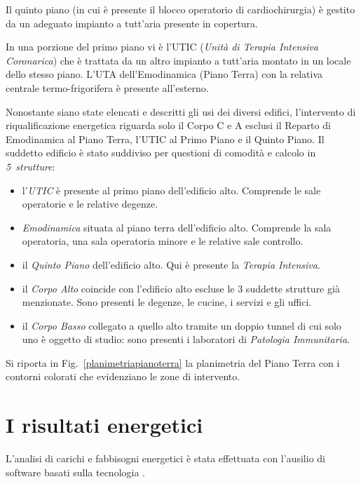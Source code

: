 Il quinto piano (in cui è presente il blocco operatorio di cardiochirurgia) è gestito da un adeguato impianto a tutt'aria presente in copertura.

In una porzione del primo piano vi è l'UTIC (\emph{Unità di Terapia Intensiva Coronarica}) che è trattata da un altro impianto a tutt'aria montato in un locale dello stesso piano. L'UTA dell'Emodinamica (Piano Terra) con la relativa centrale termo-frigorifera è presente all'esterno.

Nonostante siano state elencati e descritti gli usi dei diversi edifici, l'intervento di riqualificazione energetica riguarda solo il Corpo C e A esclusi il Reparto di Emodinamica al Piano Terra, l'UTIC al Primo Piano e il Quinto Piano.
Il suddetto edificio è stato suddiviso per questioni di comodità e calcolo in \emph{5~strutture}:
\begin{itemize}
	\item l'\emph{UTIC} è presente al primo piano dell'edificio alto. Comprende le sale operatorie e le relative degenze.
	\item \emph{Emodinamica} situata al piano terra dell'edificio alto. Comprende la sala operatoria, una sala operatoria minore e le relative sale controllo.
	\item il \emph{Quinto Piano} dell'edificio alto. Qui è presente la \emph{Terapia Intensiva}.
	\item il \emph{Corpo Alto} coincide con l'edificio alto escluse le 3 suddette strutture già menzionate. Sono presenti le degenze, le cucine, i servizi e gli uffici.
	\item il \emph{Corpo Basso} collegato a quello alto tramite un doppio tunnel di cui solo uno è oggetto di studio: sono presenti i laboratori di \emph{Patologia Immunitaria}.
\end{itemize}

Si riporta in Fig.~\vref{planimetriapianoterra} la planimetria del Piano Terra con i contorni colorati che evidenziano le zone di intervento. %

	
	
	
	
	

\section{I risultati energetici}
L'analisi di carichi e fabbisogni energetici è stata effettuata con l'ausilio di software basati sulla tecnologia \bim.

